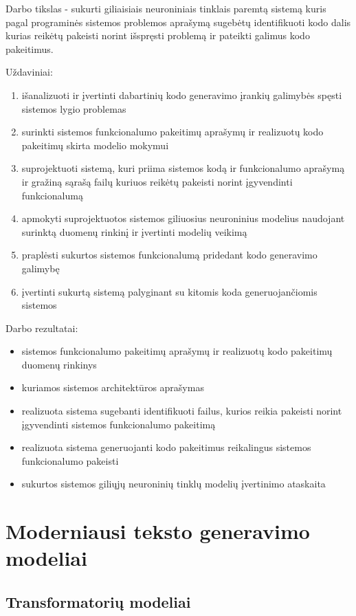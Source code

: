 \documentclass{VUMIFPSbakalaurinis}
\begin{document}
Darbo tikslas - sukurti giliaisiais neuroniniais tinklais paremtą sistemą kuris pagal programinės sistemos problemos aprašymą sugebėtų identifikuoti kodo dalis kurias reikėtų pakeisti norint išspręsti problemą ir pateikti galimus kodo pakeitimus.

Uždaviniai:
\begin{enumerate}
    \item išanalizuoti ir įvertinti dabartinių kodo generavimo įrankių galimybės spęsti sistemos lygio problemas
    \item surinkti sistemos funkcionalumo pakeitimų aprašymų ir realizuotų kodo pakeitimų skirta modelio mokymui
    \item suprojektuoti sistemą, kuri priima sistemos kodą ir funkcionalumo aprašymą ir gražiną sąrašą failų kuriuos reikėtų pakeisti norint įgyvendinti funkcionalumą
    \item apmokyti suprojektuotos sistemos giliuosius neuroninius modelius naudojant surinktą duomenų rinkinį ir įvertinti modelių veikimą
    \item praplėsti sukurtos sistemos funkcionalumą pridedant kodo generavimo galimybę
    \item įvertinti sukurtą sistemą palyginant su kitomis koda generuojančiomis sistemos
\end{enumerate}


Darbo rezultatai:
\begin{itemize}
    \item sistemos funkcionalumo pakeitimų aprašymų ir realizuotų kodo pakeitimų duomenų rinkinys
    \item kuriamos sistemos architektūros aprašymas
    \item realizuota sistema sugebanti identifikuoti failus, kurios reikia pakeisti norint įgyvendinti sistemos funkcionalumo pakeitimą
    \item realizuota sistema generuojanti kodo pakeitimus reikalingus sistemos funkcionalumo pakeisti
    \item sukurtos sistemos giliųjų neuroninių tinklų modelių įvertinimo ataskaita
\end{itemize}

\section{Moderniausi teksto generavimo modeliai}

\subsection{Transformatorių modeliai}
\end{document}
